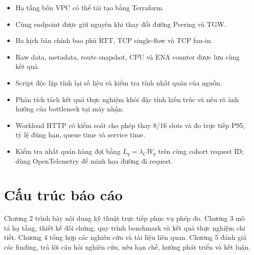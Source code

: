\begin{itemize}
  \item Hạ tầng bốn VPC có thể tái tạo bằng Terraform.
  \item Cùng endpoint được giữ nguyên khi thay đổi đường Peering và TGW.
  \item Ba kịch bản chính bao phủ RTT, TCP single-flow và TCP fan-in.
  \item Raw data, metadata, route snapshot, CPU và ENA counter được lưu cùng
        kết quả.
  \item Script độc lập tính lại số liệu và kiểm tra tính nhất quán của nguồn.
  \item Phân tích tách kết quả thực nghiệm khỏi đặc tính kiến trúc và nêu rõ
        ảnh hưởng của bottleneck tại máy nhận.
  \item Workload HTTP có kiểm soát cho phép thay 8/16 slots và đo trực tiếp
        P95, tỷ lệ đúng hạn, queue time và service time.
  \item Kiểm tra nhất quán hàng đợi bằng $L_q=\lambda_C\overline W_q$ trên
        cùng cohort request ID; dùng OpenTelemetry để minh họa đường đi request.
\end{itemize}

\section{Cấu trúc báo cáo}

Chương 2 trình bày nội dung kỹ thuật trực tiếp phục vụ phép đo. Chương 3 mô tả
hạ tầng, thiết kế đối chứng, quy trình benchmark và kết quả thực nghiệm chi
tiết. Chương 4 tổng hợp các nghiên cứu và tài liệu liên quan. Chương 5 đánh giá
các finding, trả lời câu hỏi nghiên cứu, nêu hạn chế, hướng phát triển và kết
luận.
